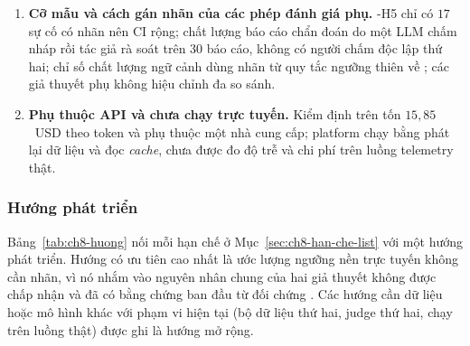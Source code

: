 \begin{enumerate}[label=(\arabic*)]
  \item \textbf{Cỡ mẫu và cách gán nhãn của các phép đánh giá phụ.} \hyp{H5} chỉ có $17$ sự cố có nhãn nên CI rộng; chất lượng báo cáo chẩn đoán do một LLM chấm nháp rồi tác giả rà soát trên $30$ báo cáo, không có người chấm độc lập thứ hai; chỉ số chất lượng ngữ cảnh dùng nhãn từ quy tắc ngưỡng thiên về ; các giả thuyết phụ không hiệu chỉnh đa so sánh.
  \item \textbf{Phụ thuộc API và chưa chạy trực tuyến.} Kiểm định trên  tốn $15{,}85$~USD theo token và phụ thuộc một nhà cung cấp; platform chạy bằng phát lại dữ liệu và đọc \textit{cache}, chưa được đo độ trễ và chi phí trên luồng telemetry thật.
\end{enumerate}

\subsubsection{Hướng phát triển}
\label{sec:ch8-huong-phat-trien}

Bảng~\ref{tab:ch8-huong} nối mỗi hạn chế ở Mục~\ref{sec:ch8-han-che-list} với một hướng phát triển. Hướng có ưu tiên cao nhất là ước lượng ngưỡng nền trực tuyến không cần nhãn, vì nó nhắm vào nguyên nhân chung của hai giả thuyết không được chấp nhận và đã có bằng chứng ban đầu từ đối chứng . Các hướng cần dữ liệu hoặc mô hình khác với phạm vi hiện tại (bộ dữ liệu thứ hai, judge thứ hai, chạy trên luồng thật) được ghi là hướng mở rộng.


